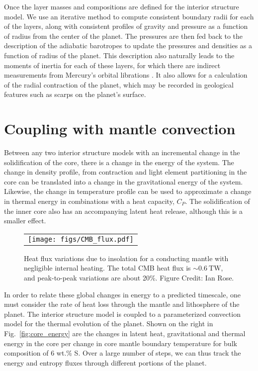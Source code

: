 Once the layer masses and compositions are defined for the interior structure model. We
use an iterative method to compute consistent boundary radii for each of the layers,
along with consistent profiles of gravity and pressure as a function of radius from
the center of the planet. The pressures are then fed back to the description of the
adiabatic barotropes to update the pressures and densities as a function of radius of
the planet. This description also naturally leads to the moments of inertia for each
of these layers, for which there are indirect measurements from Mercury's orbital librations
\citep{Margot2012}. It also allows for a calculation of the radial contraction of the
planet, which may be recorded in geological features such as scarps on the planet's
surface.


\section{Coupling with mantle convection}


Between any two interior structure models with an incremental change in the
solidification of the core, there is a change in the energy of the system. The change
in density profile, from contraction and light element partitioning in the core can
be translated into a change in the gravitational energy of the system. Likewise, the
change in temperature profile can be used to approximate a change in thermal energy
in combinations with a heat capacity, $C_P$. The solidification of the inner core
also has an accompanying latent heat release, although this is a smaller effect.

\begin{figure}[h] %
   \centering
\begin{tabular}{c}
 \texttt{[image: figs/CMB\_flux.pdf]} 
\end{tabular}
\caption{ Heat flux variations due to insolation for a conducting mantle with
    negligible internal heating. The total CMB heat flux is $\sim 0.6~\mathrm{TW}$,
and peak-to-peak variations are about 20\%. Figure Credit: Ian Rose.}
\label{fig:flux}
\end{figure}

In order to relate these global changes in energy to a predicted timescale, one must
consider the rate of heat loss through the mantle and lithosphere of the planet.  The
interior structure model is coupled to a parameterized convection model
\citep{Stevenson1983} for the thermal evolution of the planet. Shown on the right in
Fig.~\ref{fig:core_energy} are the changes in latent heat, gravitational and thermal
energy in the core per change in core mantle boundary temperature for bulk
composition of 6 wt.\% S. Over a large number of steps, we can thus track the energy
and entropy fluxes through different portions of the planet.

